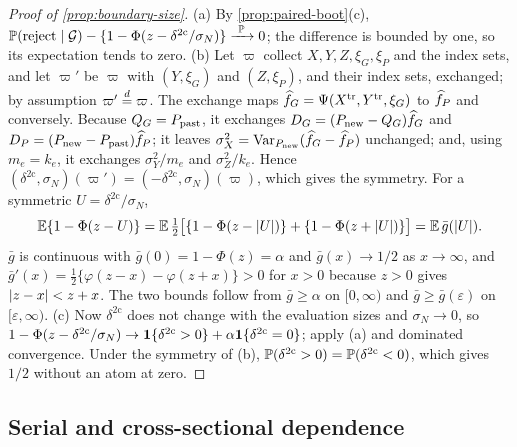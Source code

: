 \begin{proof}[Proof of \cref{prop:boundary-size}]
(a) By \cref{prop:paired-boot}(c),
$\mathbb{P}(\text{reject}\mid\mathcal{G})-\{1-\Phi(z-\delta^{\mathrm{2c}}/\sigma_N)\}\xrightarrow{\ \mathbb{P}\ }0$; the difference
is bounded by one, so its expectation tends to zero.
(b) Let $\varpi$ collect $X,Y,Z,\xi_G,\xi_P$ and the index sets, and let $\varpi'$ be $\varpi$ with $(Y,\xi_G)$
and $(Z,\xi_P)$, and their index sets, exchanged; by assumption $\varpi'\overset{d}{=}\varpi$. The exchange
maps $\widehat{f}_G=\Psi(X^{\mathrm{tr}},Y^{\mathrm{tr}},\xi_G)$ to $\widehat{f}_P$ and conversely. Because $Q_{G}=P_{\mathrm{past}}$, it
exchanges $D_G=(P_{\mathrm{new}}-Q_{G})\widehat{f}_G$ and $D_P=(P_{\mathrm{new}}-P_{\mathrm{past}})\widehat{f}_P$; it leaves
$\sigma_X^2=\operatorname{Var}_{P_{\mathrm{new}}}(\widehat{f}_G-\widehat{f}_P)$ unchanged; and, using $m_e=k_e$, it exchanges
$\sigma_Y^2/m_e$ and $\sigma_Z^2/k_e$. Hence
$(\delta^{\mathrm{2c}},\sigma_N)(\varpi')=(-\delta^{\mathrm{2c}},\sigma_N)(\varpi)$, which gives the
symmetry. For a symmetric $U=\delta^{\mathrm{2c}}/\sigma_N$,
\[
  \mathbb{E}\{1-\Phi(z-U)\}=\mathbb{E}\,\tfrac12\big[\{1-\Phi(z-\lvert U\rvert)\}+\{1-\Phi(z+\lvert U\rvert)\}\big]=\mathbb{E}\,\bar g(\lvert U\rvert).
\]
$\bar g$ is continuous with $\bar g(0)=1-\Phi(z)=\alpha$ and $\bar g(x)\to1/2$ as $x\to\infty$, and
$\bar g'(x)=\tfrac12\{\varphi(z-x)-\varphi(z+x)\}>0$ for $x>0$ because $z>0$ gives
$\lvert z-x\rvert<z+x$. The two bounds follow from $\bar g\ge\alpha$ on $[0,\infty)$ and
$\bar g\ge\bar g(\varepsilon)$ on $[\varepsilon,\infty)$.
(c) Now $\delta^{\mathrm{2c}}$ does not change with the evaluation sizes and $\sigma_N\to0$, so
$1-\Phi(z-\delta^{\mathrm{2c}}/\sigma_N)\to\mathbf{1}\{\delta^{\mathrm{2c}}>0\}+\alpha\mathbf{1}\{\delta^{\mathrm{2c}}=0\}$;
apply (a) and dominated convergence. Under the symmetry of (b),
$\mathbb{P}(\delta^{\mathrm{2c}}>0)=\mathbb{P}(\delta^{\mathrm{2c}}<0)$, which gives $1/2$ without an atom at
zero.
\end{proof}

\subsection{Serial and cross-sectional dependence}\label{app:proofs-dependence}

